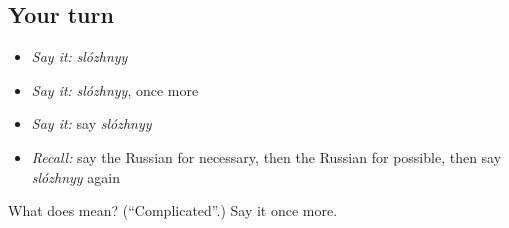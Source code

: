 \subsection*{Your turn}
\begin{itemize}
\raggedright
  \item \emph{Say it:} \emph{slózhnyy}
  \item \emph{Say it:} \emph{slózhnyy}, once more
  \item \emph{Say it:} say \emph{slózhnyy}
  \item \emph{Recall:} say the Russian for necessary, then the Russian for possible, then say \emph{slózhnyy} again
\end{itemize}

\begin{tcolorbox}[breakable,colback=teal!4,colframe=teal!35!black,title={Before you move on}]
What does  mean? (\textquotedblleft{}Complicated\textquotedblright{}.) Say it once more.
\end{tcolorbox}
